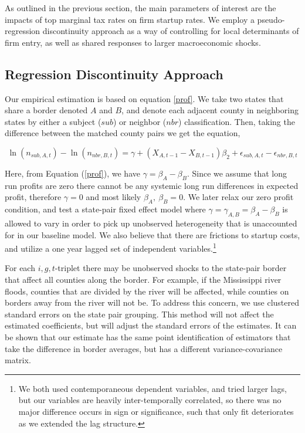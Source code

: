\documentclass[12pt,a4paper]{article}
\begin{document}
As outlined in the previous section, the main parameters of interest are the impacts of top marginal tax rates on firm startup rates. We employ a pseudo-regression discontinuity approach as a way of controlling for local determinants of firm entry, as well as shared responses to larger macroeconomic shocks.

\subsection{Regression Discontinuity Approach}

Our empirical estimation is based on equation \ref{prof}. We take two states that share a border denoted $A$ and $B$, and denote each adjacent county in neighboring states by either a subject ($sub$) or neighbor ($nbr$) classification. Then, taking the difference between the matched county pairs we get the equation,

\begin{equation}\label{pref}
\ln(n_{sub,A,t})-\ln(n_{nbr,B,t}) = \gamma+ (X_{A,t-1}-X_{B,t-1})\beta_{2} + \epsilon_{sub,A,t}-\epsilon_{nbr,B,t}
\end{equation}

Here, from Equation (\ref{prof}), we have $\gamma = \beta_{A} - \beta_{B}$. Since we assume that long run profits are zero there cannot be any systemic long run differences in expected profit, therefore $\gamma = 0$ and most likely $\beta_{A},\ \beta_{B} = 0$. We later relax our zero profit condition, and test a state-pair fixed effect model where $\gamma = \gamma_{A,B} = \beta_{A} - \beta_{B}$ is allowed to vary in order to pick up unobserved heterogeneity that is unaccounted for in our baseline model. We also believe that there are frictions to startup costs, and utilize a one year lagged set of independent variables.\footnote{We both used contemporaneous dependent variables, and tried larger lags, but our variables are heavily inter-temporally correlated, so there was no major difference occurs in sign or significance, such that only fit deteriorates as we extended the lag structure.}

For each $i,g,t$-triplet there may be unobserved shocks to the state-pair border that affect all counties along the border. For example, if the Mississippi river floods, counties that are divided by the river will be affected, while counties on borders away from the river will not be. To address this concern, we use clustered standard errors on the state pair grouping.  This method will not affect the estimated coefficients, but will adjust the standard errors of the estimates. It can be shown that our estimate has the same point identification of estimators that take the difference in border averages, but has a different variance-covariance matrix.
\end{document}
